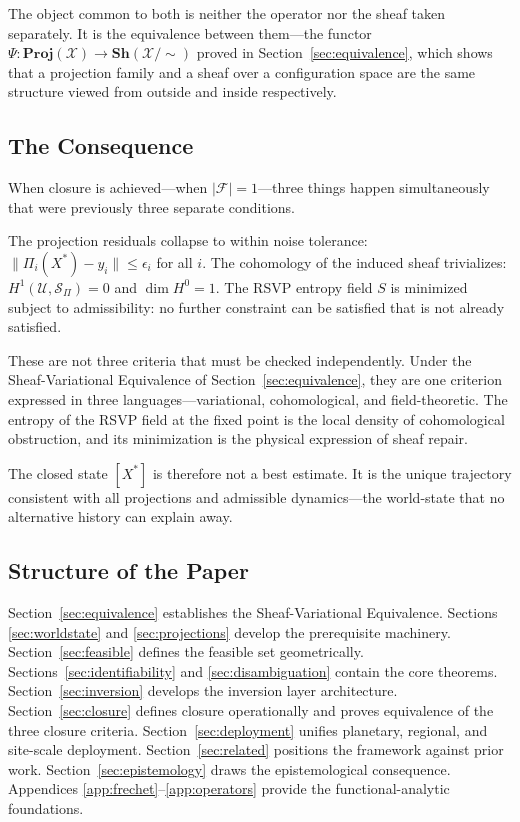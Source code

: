 \documentclass[11pt, oneside]{article}
\newcommand{\Xmod}{\mathcal{X}/{\sim}}
\begin{document}
The object common to both is neither the operator nor the sheaf taken separately. It is
the equivalence between them---the functor
$\Psi : \mathbf{Proj}(\mathcal{X}) \to \mathbf{Sh}(\Xmod)$ proved in
Section~\ref{sec:equivalence}, which shows that a projection family and a sheaf over a
configuration space are the same structure viewed from outside and inside respectively.

\subsection{The Consequence}

When closure is achieved---when $|\mathcal{F}| = 1$---three things happen simultaneously
that were previously three separate conditions.

The projection residuals collapse to within noise tolerance:
$\|\Pi_i(X^*) - y_i\| \le \epsilon_i$ for all $i$. The cohomology of the induced sheaf
trivializes: $H^1(\mathcal{U}, \mathcal{S}_\Pi) = 0$ and $\dim H^0 = 1$. The RSVP entropy
field $S$ is minimized subject to admissibility: no further constraint can be satisfied
that is not already satisfied.

These are not three criteria that must be checked independently. Under the
Sheaf-Variational Equivalence of Section~\ref{sec:equivalence}, they are one criterion
expressed in three languages---variational, cohomological, and field-theoretic. The entropy
of the RSVP field at the fixed point is the local density of cohomological obstruction,
and its minimization is the physical expression of sheaf repair.

The closed state $[X^*]$ is therefore not a best estimate. It is the unique trajectory
consistent with all projections and admissible dynamics---the world-state that no
alternative history can explain away.

\subsection{Structure of the Paper}

Section~\ref{sec:equivalence} establishes the Sheaf-Variational Equivalence. Sections
\ref{sec:worldstate} and \ref{sec:projections} develop the prerequisite machinery.
Section~\ref{sec:feasible} defines the feasible set geometrically.
Sections~\ref{sec:identifiability} and \ref{sec:disambiguation} contain the core theorems.
Section~\ref{sec:inversion} develops the inversion layer architecture.
Section~\ref{sec:closure} defines closure operationally and proves equivalence of the three
closure criteria. Section~\ref{sec:deployment} unifies planetary, regional, and site-scale
deployment. Section~\ref{sec:related} positions the framework against prior work.
Section~\ref{sec:epistemology} draws the epistemological consequence. Appendices
\ref{app:frechet}--\ref{app:operators} provide the functional-analytic foundations.
\end{document}

